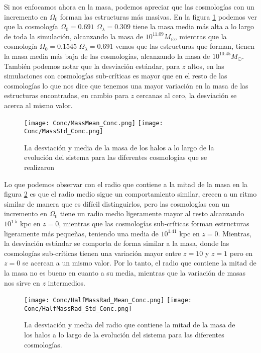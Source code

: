 Si nos enfocamos ahora en la masa, podemos apreciar que las cosmologías con un incremento en $\Omega_0$ forman las estructuras más masivas. En la figura \ref{fig:Conc_Mass} podemos ver que la cosmología $\Omega_0=0.691$ $\Omega_\lambda=0.309$ tiene la masa media más alta a lo largo de toda la simulación, alcanzando la masa de $10^{11.09}M_\odot$, mientras que la cosmología $\Omega_0=0.1545$ $\Omega_\lambda=0.691$ vemos que las estructuras que forman, tienen la masa media más baja de las cosmologías, alcanzando la masa de $10^{10.45} M_\odot$. También podemos notar que la desviación estándar, para $z$ altos, en las simulaciones con cosmologías sub-críticas es mayor que en el resto de las cosmologías lo que nos dice que tenemos una mayor variación en la masa de las estructuras encontradas, en cambio para $z$ cercanas al cero, la desviación se acerca al mismo valor.
\begin{figure}[H]
      \centering
      \texttt{[image: Conc/MassMean\_Conc.png]}
      \texttt{[image: Conc/MassStd\_Conc.png]}
      \caption[Evolución de la desviación y media de la masa de los halos para todas las cosmologías]{La desviación y media de la masa de los halos a lo largo de la evolución del sistema para las diferentes cosmologías que se realizaron}
      \label{fig:Conc_Mass}
\end{figure}

Lo que podemos observar con el radio que contiene a la mitad de la masa en la figura \ref{fig:Conc_HalfMassRad} es que el radio medio sigue un comportamiento similar, crecen a un ritmo similar de manera que es difícil distinguirlos, pero las cosmologías con un incremento en $\Omega_0$ tiene un radio medio ligeramente mayor al resto alcanzando $10^{1.5}$ kpc en $z=0$, mientras que las cosmologías sub-críticas forman estructuras ligeramente más pequeñas, teniendo una media de $10^{1.41}$ kpc en $z=0$. Mientras, la desviación estándar se comporta de forma similar a la masa, donde las cosmologías sub-críticas tienen una variación mayor entre $z=10$ y $z=1$ pero en $z=0$ se acercan a un mismo valor. Por lo tanto, el radio que contiene la mitad de la masa no es bueno en cuanto a su media, mientras que la variación de masas nos sirve en $z$ intermedios.

\begin{figure}[H]
      \centering
      \texttt{[image: Conc/HalfMassRad\_Mean\_Conc.png]}
      \texttt{[image: Conc/HalfMassRad\_Std\_Conc.png]}
      \caption[Evolución de la desviación y media del radio que contiene la mitad de la masa de los halos para todas las cosmologías]{La desviación y media del radio que contiene la mitad de la masa de los halos a lo largo de la evolución del sistema para las diferentes cosmologías.}
      \label{fig:Conc_HalfMassRad}
\end{figure}

